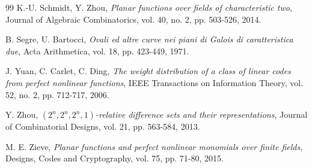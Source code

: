 \documentclass[12pt]{amsart}
\begin{document}
\begin{thebibliography}{99}
 K.-U. Schmidt, Y. Zhou, \textit{Planar functions over fields of characteristic two}, Journal of Algebraic Combinatorics, vol. 40, no. 2, pp. 503-526, 2014.

 B. Segre, U. Bartocci, \textit{Ovali ed altre curve nei piani di Galois di caratteristica due}, Acta Arithmetica, vol. 18, pp. 423-449, 1971.


 J. Yuan, C. Carlet, C. Ding, \textit{The weight distribution of a class of linear codes from perfect nonlinear functions}, IEEE Transactions on Information Theory, vol. 52, no. 2, pp. 712-717, 2006.

 Y. Zhou, \textit{$(2^n, 2^n, 2^n, 1)$-relative difference sets and their representations}, Journal of Combinatorial Designs, vol. 21, pp. 563-584, 2013.

 M. E. Zieve, \textit{Planar functions and perfect nonlinear monomials over finite fields}, Designs, Codes and Cryptography, vol. 75, pp. 71-80, 2015.

\end{thebibliography}
	
\end{document}
